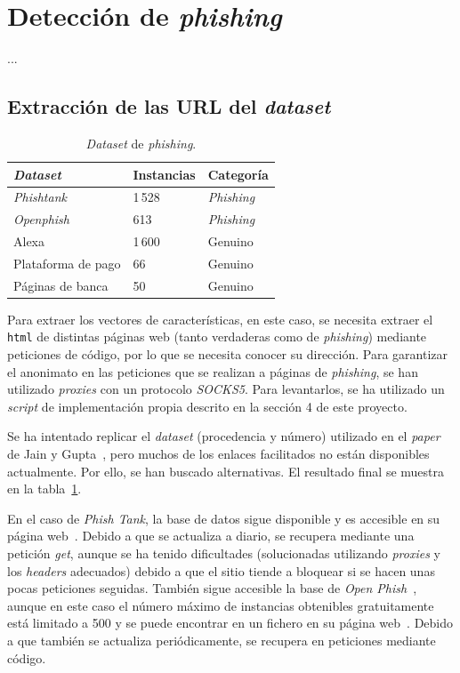 \section{Detección de \textit{phishing}}
...

\subsection{Extracción de las URL del \textit{dataset}}

\begin{table}
	\begin{centering}
		\begin{tabular}{@{} p{14em} p{6em} p{6em}@{}}
			\toprule
			\textbf{\textit{Dataset}} & \textbf{Instancias} &  \textbf{Categoría} \\ \midrule
			\textit{Phishtank} & 1\,528 & \textit{Phishing}\\
			\textit{Openphish} & 613 & \textit{Phishing}\\
			Alexa & 1\,600 & Genuino\\
			Plataforma de pago & 66 & Genuino\\
			Páginas de banca & 50 & Genuino\\
			\bottomrule
		\end{tabular}
		\caption[\textit{Phishing}: descripción del \textit{dataset}]{\textit{Dataset} de \textit{phishing}.}
		\label{tbl:dataset_phishing}	
	\end{centering}
\end{table}

Para extraer los vectores de características, en este caso, se necesita extraer el \texttt{html} de distintas páginas web (tanto verdaderas como de \textit{phishing}) mediante peticiones de código, por lo que se necesita conocer su dirección. Para garantizar el anonimato en las peticiones que se realizan a páginas de \textit{phishing}, se han utilizado \textit{proxies} con un protocolo \textit{SOCKS5}. Para levantarlos, se ha utilizado un \textit{script} de implementación propia descrito en la sección 4 de este proyecto.

Se ha intentado replicar el \textit{dataset} (procedencia y número) utilizado en el \textit{paper} de Jain y Gupta~\cite{featuresPhishing2018Gupta}, pero muchos de los enlaces facilitados no están disponibles actualmente. Por ello, se han buscado alternativas. El resultado final se muestra en la tabla~\ref{tbl:dataset_phishing}.

En el caso de \textit{Phish Tank}, la base de datos sigue disponible y es accesible en su página web~\cite{phishTankDB}. Debido a que se actualiza a diario, se recupera mediante una petición \textit{get}, aunque se ha tenido dificultades (solucionadas utilizando \textit{proxies} y los \textit{headers} adecuados) debido a que el sitio tiende a bloquear si se hacen unas pocas peticiones seguidas. También sigue accesible la base de \textit{Open Phish}~\cite{openFishDB}, aunque en este caso el número máximo de instancias obtenibles gratuitamente está limitado a 500 y se puede encontrar en un fichero en su página web~\cite{openFishFile}. Debido a que también se actualiza periódicamente, se recupera en peticiones mediante código.

